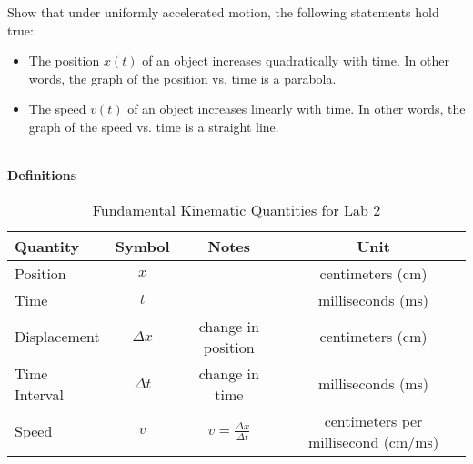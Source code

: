 Show that under uniformly accelerated motion, the following statements hold true:
\begin{itemize}
\item The position $x(t)$ of an object increases quadratically with time. In other words, the graph of the position vs. time is a parabola. 
\item The speed $v(t)$ of an object increases linearly with time. In other words, the graph of the speed vs. time is a straight line. 
\end{itemize}
\textbf{\\\Large Definitions\\}
\begin{table}[h!]
\centering
\captionsetup{font=small, labelfont=bf}
\caption{Fundamental Kinematic Quantities for Lab 2}
\label{tab:kinematics}
\begin{tabular}{@{} l c c c @{}}
\toprule
\textbf{Quantity} & \textbf{Symbol} & \textbf{Notes}  & \textbf{Unit} \\
\midrule
Position    & $x$ & & centimeters (cm) \\
Time & $t$ & & milliseconds (ms) \\
Displacement & $\Delta x$ & change in position & centimeters (cm)\\
Time Interval & $\Delta t$ & change in time & milliseconds (ms)\\
Speed & $v$ & $v = \frac{\Delta x}{\Delta t}$ & centimeters per millisecond (cm/ms) \\
\bottomrule
\end{tabular}
\end{table}

